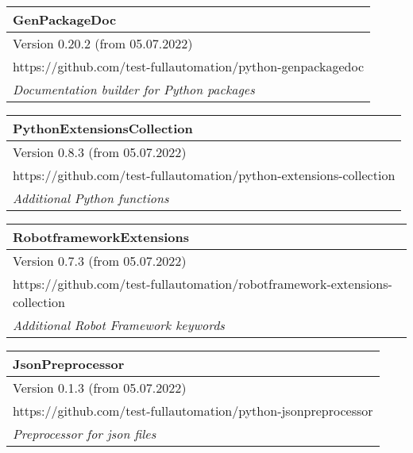 \begin{center}
\begin{tabular}{| m{44em} |}\hline
   \textbf{GenPackageDoc}\\ \hline
   Version 0.20.2 (from 05.07.2022)\\ \hline
   https://github.com/test-fullautomation/python-genpackagedoc\\ \hline
   \textit{Documentation builder for Python packages}\\ \hline
\end{tabular}

\vspace{2ex}

\begin{tabular}{| m{44em} |}\hline
   \textbf{PythonExtensionsCollection}\\ \hline
   Version 0.8.3 (from 05.07.2022)\\ \hline
   https://github.com/test-fullautomation/python-extensions-collection\\ \hline
   \textit{Additional Python functions}\\ \hline
\end{tabular}

\vspace{2ex}

\begin{tabular}{| m{44em} |}\hline
   \textbf{RobotframeworkExtensions}\\ \hline
   Version 0.7.3 (from 05.07.2022)\\ \hline
   https://github.com/test-fullautomation/robotframework-extensions-collection\\ \hline
   \textit{Additional Robot Framework keywords}\\ \hline
\end{tabular}

\vspace{2ex}

\begin{tabular}{| m{44em} |}\hline
   \textbf{JsonPreprocessor}\\ \hline
   Version 0.1.3 (from 05.07.2022)\\ \hline
   https://github.com/test-fullautomation/python-jsonpreprocessor\\ \hline
   \textit{Preprocessor for json files}\\ \hline
\end{tabular}

\vspace{2ex}


\end{center}

